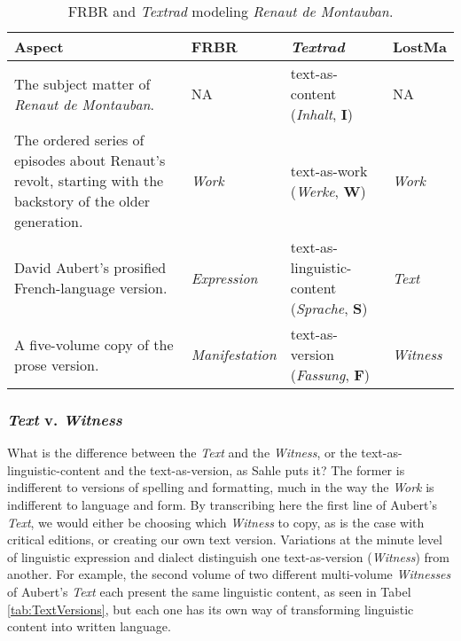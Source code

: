 \begin{table}[ht]
    \begin{center}
    \begin{tabular}{|p{}|p{}|p{}|p{}|}
        \hline
        \textbf{Aspect} & \textbf{FRBR} & \textbf{\textit{Textrad}} & \textbf{LostMa} \\ \hline
        The subject matter of \textit{Renaut de Montauban}. & NA & text-as-content \newline (\textit{Inhalt}, \textbf{I}) & NA \\ \hline
        The ordered series of episodes about Renaut's revolt, starting with the backstory of the older generation. & \textit{Work} & text-as-work \newline (\textit{Werke}, \textbf{W}) & \textit{Work} \\ \hline
        David Aubert's prosified French-language version. & \textit{Expression} & text-as-linguistic-content \newline (\textit{Sprache}, \textbf{S}) & \textit{Text} \\ \hline
        A five-volume copy of the prose version. & \textit{Manifestation} & text-as-version \newline (\textit{Fassung}, \textbf{F}) & \textit{Witness} \\ \hline
    \end{tabular}
    \end{center}
\caption{FRBR and \textit{Textrad} modeling \textit{Renaut de Montauban}.}
\label{tab:Renaut}
\end{table}

\subsubsection{\textit{Text} v. \textit{Witness}}

What is the difference between the \textit{Text} and the \textit{Witness}, or the text-as-linguistic-content and the text-as-version, as Sahle puts it? The former is indifferent to versions of spelling and formatting, much in the way the \textit{Work} is indifferent to language and form. By transcribing here the first line of Aubert's \textit{Text}, we would either be choosing which \textit{Witness} to copy, as is the case with critical editions, or creating our own text version. Variations at the minute level of linguistic expression and dialect distinguish one text-as-version (\textit{Witness}) from another. For example, the second volume of two different multi-volume \textit{Witnesses} of Aubert's \textit{Text} each present the same linguistic content, as seen in Tabel \ref{tab:TextVersions}, but each one has its own way of transforming linguistic content into written language.

